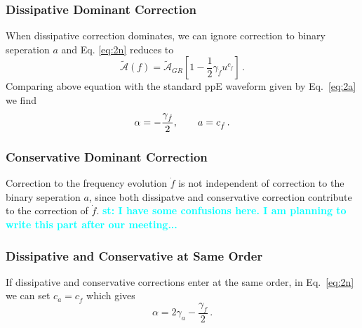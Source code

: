 \documentclass[11pt]{article}
\newcommand{\st}[1]{\textcolor{cyan}{\textbf{st: #1}} }
\begin{document}
\subsubsection*{Dissipative Dominant Correction}
\hspace{15.5pt}When dissipative correction dominates, we can ignore correction to binary seperation $a$ and Eq. \eqref{eq:2n} reduces to
\begin{equation}
\tilde{\mathcal{A}}(f)=\tilde{\mathcal{A}}_{GR} \left[1-\frac{1}{2}\gamma_{\dot{f}}u^{c_{\dot{f}}}\right]\,.
\end{equation}
Comparing above equation with the standard ppE waveform given by Eq.~\eqref{eq:2a} we find
\begin{equation}
\alpha=-\frac{\gamma_{\dot{f}}}{2},\hspace*{20pt}a=c_{\dot{f}}\,.
\end{equation}
\subsubsection*{Conservative Dominant Correction}
\hspace{15.5pt}Correction to the frequency evolution $\dot{f}$ is not independent of correction to the binary seperation $a$, since both dissipatve and conservative correction contribute to the correction of $\dot{f}$. \st{I have some confusions here. I am planning to write this part after our meeting...}
\subsubsection*{Dissipative and Conservative at Same Order}
\hspace{15.5pt}If dissipative and conservative corrections enter at the same order, in Eq.~\eqref{eq:2n} we can set $c_a=c_{\dot{f}}$ which gives
\begin{equation}
\alpha=2 \text{$\gamma_a $}-\frac{\text{$\gamma_{\dot{f}} $}}{2}\,.
\end{equation}
\end{document}
